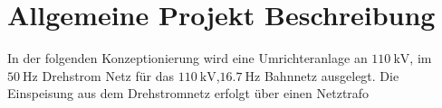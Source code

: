 \clearpage
\section{Allgemeine Projekt Beschreibung}
In der folgenden Konzeptionierung wird eine Umrichteranlage an $\SI{110}{\kV}$, im $\SI{50}{\Hz}$ Drehstrom Netz für das $\SI{110}{\kV}$,$\SI{16.7}{\Hz}$ Bahnnetz ausgelegt.
Die Einspeisung aus dem Drehstromnetz erfolgt über einen Netztrafo 

